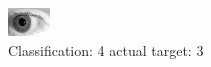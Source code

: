 \begin{figure}[h!]
\begin{center}
\includegraphics[width=0.60\columnwidth]{figures/ID259_class_4_target_3.png}
\end{center}
\caption{ Classification: 4 actual target: 3}
\label{fig:ID259_class_4_target_3}
\end{figure}
